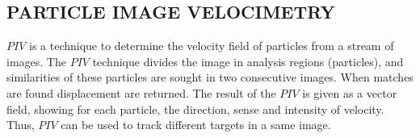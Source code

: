 
\subsection{PARTICLE IMAGE VELOCIMETRY}

$PIV$ is a technique to determine the  velocity field of particles from a stream of images\cite{Bastiaans}.
The $PIV$ technique divides the image in analysis regions (particles), 
and similarities of these particles are sought in two consecutive images.
When matches are found displacement are returned.
The result of the $PIV$ is given as a vector field, showing for each particle, the direction, sense and intensity of velocity. 
Thus, $PIV$ can be used to track different targets in a same image.

